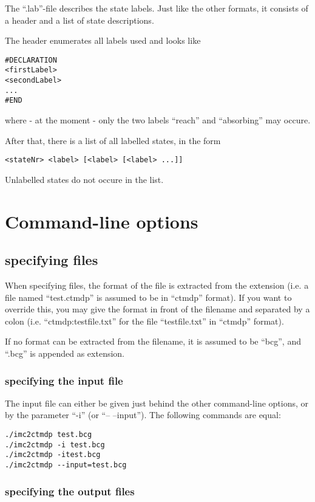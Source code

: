 \documentclass[a4paper,11pt]{scrartcl}
\newcommand{\dd}{-- --}
\begin{document}
The ``.lab''-file describes the state labels.
Just like the other formats, it consists of a header and a list of state
descriptions.

The header enumerates all labels used and looks like
\begin{verbatim}
#DECLARATION
<firstLabel>
<secondLabel>
...
#END
\end{verbatim}
where - at the moment - only the two labels ``reach'' and ``absorbing'' may
occure.

After that, there is a list of all labelled states, in the form
\begin{verbatim}
<stateNr> <label> [<label> [<label> ...]]
\end{verbatim}

Unlabelled states do not occure in the list.


\section{Command-line options}

\subsection{specifying files}

When specifying files, the format of the file is extracted from the extension
(i.e. a file named ``test.ctmdp'' is assumed to be in ``ctmdp'' format).
If you want to override this, you may give the format in front of the filename
and separated by a colon (i.e. ``ctmdp:testfile.txt'' for the file
``testfile.txt'' in ``ctmdp'' format).

If no format can be extracted from the filename, it is assumed to be ``bcg'',
and ``.bcg'' is appended as extension.


\subsubsection{\label{sec:input-file}specifying the input file}

The input file can either be given just behind the other command-line
options, or by the parameter ``-i'' (or ``\dd input'').
The following commands are equal:
\begin{verbatim}
./imc2ctmdp test.bcg
./imc2ctmdp -i test.bcg
./imc2ctmdp -itest.bcg
./imc2ctmdp --input=test.bcg
\end{verbatim}

\subsubsection{\label{sec:output-files}specifying the output files}
\end{document}
